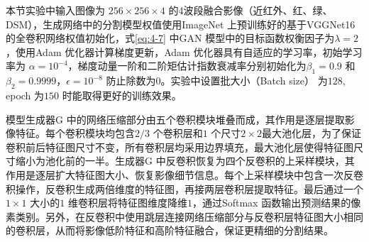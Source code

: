 本节实验中输入图像为 $256\times 256\times 4$ 的4波段融合影像（近红外、红、绿、DSM），生成网络中的分割模型权值使用ImageNet 上预训练好的基于VGGNet16\cite{simonyan2014very} 的全卷积网络权值初始化，式\ref{eq:4-7} 中GAN 模型中的目标函数权衡因子为$\lambda = 2$ ，使用Adam \cite{kingma2014adam} 优化器计算梯度更新，Adam 优化器具有自适应的学习率，初始学习率为 $\alpha = 10^{-4}$，梯度动量一阶和二阶矩估计指数衰减率分别初始化为$\beta_1 = 0.9$ 和$\beta_2 = 0.9999$，$\epsilon = 10^{-8}$ 防止除数为$0$。实验中设置批大小（Batch size） 为$128$, epoch 为$150$ 时能取得更好的训练效果。

模型生成器G 中的网络压缩部分由五个卷积模块堆叠而成，其作用是逐层提取影像特征。每个卷积模块均包含$2/3$ 个卷积层和$1$ 个尺寸$2\times 2$最大池化层，为了保证卷积前后特征图尺寸不变，所有卷积层均采用边界填充，最大池化层使得特征图尺寸缩小为池化前的一半。生成器G 中反卷积恢复为四个反卷积的上采样模块，其作用是逐层扩大特征图大小、恢复影像细节信息。每个上采样模块中包含一次反卷积操作，反卷积生成两倍维度的特征图，再接两层卷积层提取特征。最后通过一个$1\times 1$ 大小的$1$ 维卷积层将特征图维度降维$1$，通过Softmax 函数输出预测结果的像素类别。另外，在反卷积中使用跳层连接网络压缩部分与反卷积层特征图大小相同的卷积层，从而将影像低阶特征和高阶特征融合，保证更精细的分割结果。

